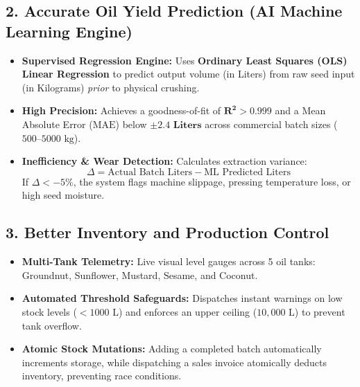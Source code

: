 \documentclass[11pt,a4paper]{article}
\begin{document}
\subsection{2. Accurate Oil Yield Prediction (AI Machine Learning Engine)}
\begin{itemize}[leftmargin=1.5em]
    \item \textbf{Supervised Regression Engine:} Uses \textbf{Ordinary Least Squares (OLS) Linear Regression} to predict output volume (in Liters) from raw seed input (in Kilograms) \textit{prior} to physical crushing.
    \item \textbf{High Precision:} Achieves a goodness-of-fit of $\mathbf{R^2 > 0.999}$ and a Mean Absolute Error ($\text{MAE}$) below $\mathbf{\pm 2.4\text{ Liters}}$ across commercial batch sizes ($500\text{--}5000\text{ kg}$).
    \item \textbf{Inefficiency \& Wear Detection:} Calculates extraction variance:
    \[
    \Delta = \text{Actual Batch Liters} - \text{ML Predicted Liters}
    \]
    If $\Delta < -5\%$, the system flags machine slippage, pressing temperature loss, or high seed moisture.
\end{itemize}

\subsection{3. Better Inventory and Production Control}
\begin{itemize}[leftmargin=1.5em]
    \item \textbf{Multi-Tank Telemetry:} Live visual level gauges across 5 oil tanks: Groundnut, Sunflower, Mustard, Sesame, and Coconut.
    \item \textbf{Automated Threshold Safeguards:} Dispatches instant warnings on low stock levels ($< 1000\text{ L}$) and enforces an upper ceiling ($10,000\text{ L}$) to prevent tank overflow.
    \item \textbf{Atomic Stock Mutations:} Adding a completed batch automatically increments storage, while dispatching a sales invoice atomically deducts inventory, preventing race conditions.
\end{itemize}
\end{document}
